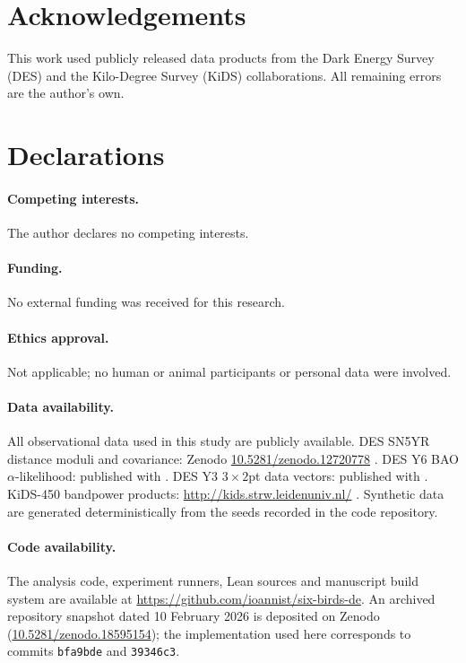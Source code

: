 \documentclass[11pt]{article}
\theoremstyle{plain}
\theoremstyle{definition}
\theoremstyle{remark}
\begin{document}
\section*{Acknowledgements}
This work used publicly released data products from the Dark Energy Survey (DES) and the Kilo-Degree Survey (KiDS) collaborations. All remaining errors are the author's own.

\section*{Declarations}

\paragraph{Competing interests.}
The author declares no competing interests.

\paragraph{Funding.}
No external funding was received for this research.

\paragraph{Ethics approval.}
Not applicable; no human or animal participants or personal data were involved.

\paragraph{Data availability.}
All observational data used in this study are publicly available.
DES SN5YR distance moduli and covariance: Zenodo \href{https://doi.org/10.5281/zenodo.12720778}{10.5281/zenodo.12720778} \cite{DES2024SN5YRData}.
DES Y6 BAO $\alpha$-likelihood: published with \cite{DES2024Y6BAO}.
DES Y3 $3\times2$pt data vectors: published with \cite{DES2022Y3_3x2pt}.
KiDS-450 bandpower products: \url{http://kids.strw.leidenuniv.nl/} \cite{vanUitert2018KiDSGAMA,KiDSDataProducts}.
Synthetic data are generated deterministically from the seeds recorded in the code repository.

\paragraph{Code availability.}
The analysis code, experiment runners, Lean sources and manuscript build system are available at \url{https://github.com/ioannist/six-birds-de}.
An archived repository snapshot dated 10 February 2026 is deposited on Zenodo (\href{https://doi.org/10.5281/zenodo.18595154}{10.5281/zenodo.18595154}); the implementation used here corresponds to commits \texttt{bfa9bde} and \texttt{39346c3}.
\end{document}
